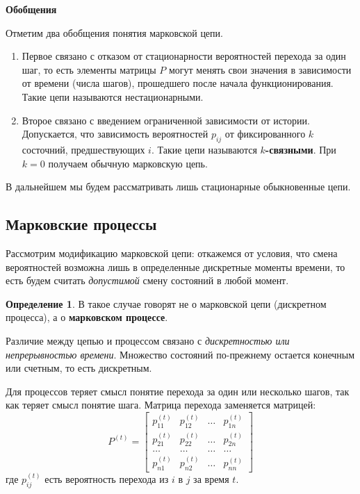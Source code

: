 \documentclass[aps,%
12pt,%
final,%
oneside,
onecolumn,%
musixtex, %
superscriptaddress,%
centertags]{article} %
\theoremstyle{plain}
\theoremstyle{definition}
\newtheorem{definition}{Определение}[subsection]
\theoremstyle{remark}
\begin{document}
\textbf{Обобщения}

Отметим два обобщения понятия марковской цепи.

\begin{enumerate}
	\item Первое связано с отказом от стационарности вероятностей перехода за один шаг, то есть элементы матрицы $P$ могут менять свои значения в зависимости от времени (числа шагов), прошедшего после начала функционирования. Такие цепи называются нестационарными.
	\item Второе связано с введением ограниченной зависимости от истории. Допускается, что зависимость вероятностей $p_{ij}$ от фиксированного $k$ состочний, предшествующих $i$. Такие цепи называются \textbf{$k$-связными}. При $k=0$ получаем обычную марковскую цепь.
\end{enumerate}

В дальнейшем мы будем рассматривать лишь стационарные обыкновенные цепи.

\newpage

\subsection{Марковские процессы}

Рассмотрим модификацию марковской цепи: откажемся от условия, что смена вероятностей возможна лишь в определенные дискретные моменты времени, то есть будем считать \textit{допустимой} смену состояний в любой момент.

\begin{definition}
	В такое случае говорят не о марковской цепи (дискретном процесса), а о \textbf{марковском процессе}.
\end{definition}

Различие между цепью и процессом связано с \textit{дискретностью или непрерывностью времени}. Множество состояний по-прежнему остается конечным или счетным, то есть дискретным.

Для процессов теряет смысл понятие перехода за один или несколько шагов, так как теряет смысл понятие шага. Матрица перехода заменяется матрицей:
$$P^{(t)} = \begin{bmatrix}
		p_{11}^{(t)} & p_{12}^{(t)} & \ldots & p_{1n}^{(t)} \\
		p_{21}^{(t)} & p_{22}^{(t)} & \ldots & p_{2n}^{(t)} \\
		\ldots & \ldots & \ldots & \ldots \\
		p_{n1}^{(t)} & p_{n2}^{(t)} & \ldots & p_{nn}^{(t)}
	\end{bmatrix}$$
где $p_{ij}^{(t)}$ есть вероятность перехода из $i$ в $j$ за время $t$.
\end{document}
